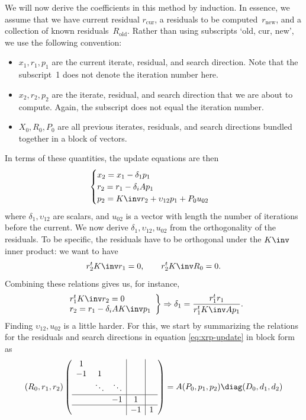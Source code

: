 We will now derive the coefficients in this method by induction. In
essence, we assume that we have current residual $r_{\mathrm{cur}}$, a
residuals to be computed~$r_{\mathrm{new}}$, and a collection of known
residuals~$R_{\mathrm{old}}$. Rather than using subscripts `old, cur,
new', we use the following convention:
\begin{itemize}
\item $x_1,r_1,p_1$ are the current iterate, residual, and search
  direction. Note that the subscript~1 does not denote the iteration
  number here.
\item $x_2,r_2,p_2$ are the iterate, residual, and search direction
  that we are about to compute. Again, the subscript does not equal
  the iteration number.
\item $X_0,R_0,P_0$ are all previous iterates, residuals, and search
  directions bundled together in a block of vectors.
\end{itemize}
In terms of these quantities, the update equations are then
\begin{equation}
\begin{cases}
  x_2=x_1-\delta_1 p_1 \\
  r_2=r_1-\delta_iA p_1 \\
  p_2 = K\inv r_2+\upsilon_{12}p_1+P_0u_{02}
\end{cases}
\label{eq:cg-updates-xrp}
\end{equation}
where $\delta_1,\upsilon_{12}$ are scalars, and $u_{02}$ is a vector with
length the number of iterations before the current. We now derive
$\delta_1,\upsilon_{12},u_{02}$ from the orthogonality of the residuals. To
be specific, the residuals have to be orthogonal under the $K\inv$
inner product: we want to have
\[
  r_2^tK\inv r_1=0,\qquad r_2^tK\inv R_0=0.
\]
Combining these relations gives us, for instance,
\[
  \left.
  \begin{array}{l}
    r_1^tK\inv r_2=0\\   r_2=r_1-\delta_iAK\inv p_1
  \end{array}
  \right\} \Rightarrow
  \delta_1 = \frac{r_1^tr_1}{r_1^tK\inv Ap_1}.
\]
Finding $\upsilon_{12},u_{02}$ is a little harder. For this, we start by
summarizing the relations for the residuals and search directions
in equation \eqref{eq:xrp-update} in block
form as 
\[
  (R_0,r_1,r_2) \left(
\begin{array}{r|c|c}
  \begin{matrix}1\\ -1&1\\ &\ddots&\ddots \end{matrix}
  &&\\ \hline -1&1&\\ \hline &-1&1
\end{array}
  \right) = A(P_0,p_1,p_2)\diag(D_0,d_1,d_2)
\]
